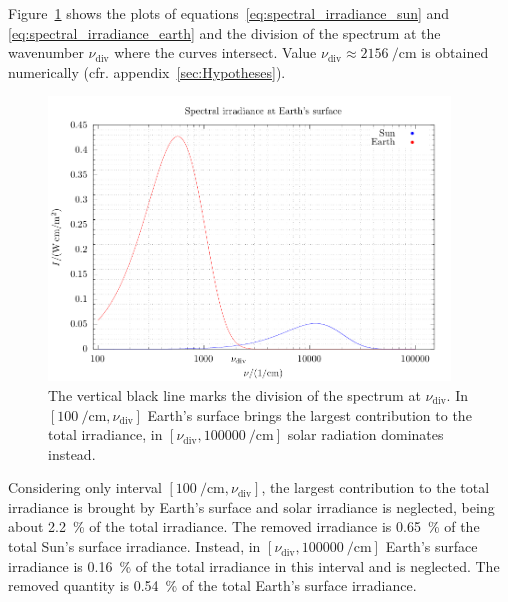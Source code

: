 \documentclass[a4paper,10pt,final,twocolumn]{article}
\begin{document}
Figure~\ref{fig:spectral_irradiance} shows the plots of equations~\eqref{eq:spectral_irradiance_sun} and \eqref{eq:spectral_irradiance_earth} and the division of the spectrum at the wavenumber $\nu_\text{div}$ where the curves intersect. Value $\nu_\text{div} \approx \qty{2156}{\per\centi\metre}$ is obtained numerically (cfr. appendix~\ref{sec:Hypotheses}).
\begin{figure}[h]
  \centering
  \includegraphics*[keepaspectratio=true,width=0.95\textwidth]{spectral_irradiance}
  \caption{The vertical black line marks the division of the spectrum at $\nu_\text{div}$. In $[\qty{100}{\per\centi\metre}, \nu_\text{div}]$ Earth's surface brings the largest contribution to the total irradiance, in $[\nu_\text{div}, \qty{100000}{\per\centi\metre}]$ solar radiation dominates instead.}
  \label{fig:spectral_irradiance}
\end{figure}

Considering only interval $[\qty{100}{\per\centi\metre}, \nu_\text{div}]$, the largest contribution to the total irradiance is brought by Earth's surface and solar irradiance is neglected, being about \qty{2.2}{\percent} of the total irradiance. The removed irradiance is \qty{0.65}{\percent} of the total Sun's surface irradiance. %
Instead, in $[\nu_\text{div}, \qty{100000}{\per\centi\metre}]$ Earth's surface irradiance is \qty{0.16}{\percent} of the total irradiance in this interval and is neglected. The removed quantity is \qty{0.54}{\percent} of the total Earth's surface irradiance. %

\end{document}
